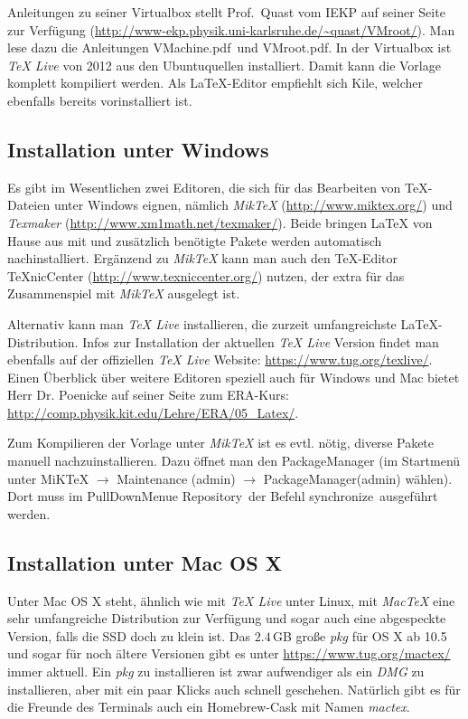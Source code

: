 Anleitungen zu seiner Virtualbox stellt Prof.~Quast vom IEKP auf seiner Seite 
zur Verfügung (\url{http://www-ekp.physik.uni-karlsruhe.de/~quast/VMroot/}). Man 
lese dazu die Anleitungen \glqq VMachine.pdf\grqq\ und \glqq VMroot.pdf\grqq. In 
der Virtualbox ist \textit{TeX Live} von 2012 aus den Ubuntuquellen installiert. 
Damit kann die Vorlage komplett kompiliert werden. Als LaTeX-Editor empfiehlt 
sich Kile, welcher ebenfalls bereits vorinstalliert ist.

\subsection{Installation unter Windows}
Es gibt im Wesentlichen zwei Editoren, die sich für das Bearbeiten von 
TeX-Dateien unter Windows eignen, nämlich \textit{MikTeX} 
(\url{http://www.miktex.org/}) und \textit{Texmaker} 
(\url{http://www.xm1math.net/texmaker/}). Beide bringen LaTeX von Hause aus mit 
und zusätzlich benötigte Pakete werden automatisch nachinstalliert. Ergänzend zu 
\textit{MikTeX} kann man auch den TeX-Editor TeXnicCenter 
(\url{http://www.texniccenter.org/}) nutzen, der extra für das Zusammenspiel mit 
\textit{MikTeX} ausgelegt ist.

Alternativ kann man \textit{TeX Live} installieren, die zurzeit umfangreichste 
LaTeX-Distribution. Infos zur Installation der aktuellen \textit{TeX Live} 
Version findet man ebenfalls auf der offiziellen \textit{TeX Live} Website: 
\url{https://www.tug.org/texlive/}. Einen Überblick über weitere Editoren 
speziell auch für Windows und Mac bietet Herr Dr. Poenicke auf seiner Seite zum 
ERA-Kurs: \url{http://comp.physik.kit.edu/Lehre/ERA/05_Latex/}.

Zum Kompilieren der Vorlage unter \textit{MikTeX} ist es evtl. nötig, diverse 
Pakete manuell nachzuinstallieren. Dazu öffnet man den PackageManager (im 
Startmenü unter MiKTeX $\rightarrow$ Maintenance (admin) $\rightarrow$ 
PackageManager(admin) wählen). Dort muss im PullDownMenue \glqq Repository\grqq\ 
der Befehl \glqq synchronize\grqq\ ausgeführt werden.

\subsection{Installation unter Mac OS X}
Unter Mac OS X steht, ähnlich wie mit \textit{TeX Live} unter Linux, mit 
\textit{MacTeX} eine sehr umfangreiche Distribution zur Verfügung und sogar auch 
eine abgespeckte Version, falls die SSD doch zu klein ist. Das $2.4$\,GB große 
\textit{pkg} für OS X ab 10.5 und sogar für noch ältere Versionen gibt es unter 
\url{https://www.tug.org/mactex/} immer aktuell. Ein \textit{pkg} zu 
installieren ist zwar aufwendiger als ein \textit{DMG} zu installieren, aber mit 
ein paar Klicks auch schnell geschehen. Natürlich gibt es für die Freunde des 
Terminals auch ein Homebrew-Cask mit Namen \textit{mactex}.

